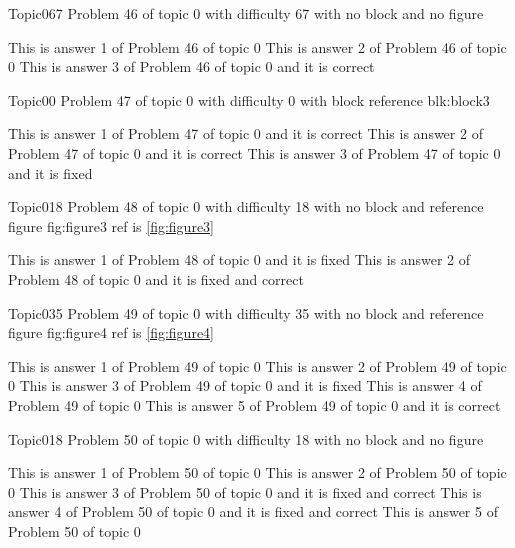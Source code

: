 \documentclass[master]{exam}
\begin{document}
\begin{problem}{Topic0}{67}
	Problem 46 of topic 0 with difficulty 67 with no block and no figure
	\begin{answers}
		\answer This is answer 1 of Problem 46 of topic 0 
		\answer This is answer 2 of Problem 46 of topic 0 
		\answer[correct] This is answer 3 of Problem 46 of topic 0 and it is correct
	\end{answers}
\end{problem}

\begin{problem}[requires=blk:block3]{Topic0}{0}
	Problem 47 of topic 0 with difficulty 0 with block reference blk:block3
	\begin{answers}
		\answer[correct] This is answer 1 of Problem 47 of topic 0 and it is correct
		\answer[correct] This is answer 2 of Problem 47 of topic 0 and it is correct
		\answer[fixed] This is answer 3 of Problem 47 of topic 0 and it is fixed
	\end{answers}
\end{problem}

\begin{problem}{Topic0}{18}
	Problem 48 of topic 0 with difficulty 18 with no block and reference figure fig:figure3 ref is \ref{fig:figure3}
	\begin{answers}
		\answer[fixed] This is answer 1 of Problem 48 of topic 0 and it is fixed
		 This is answer 2 of Problem 48 of topic 0 and it is fixed and correct
	\end{answers}
\end{problem}

\begin{problem}{Topic0}{35}
	Problem 49 of topic 0 with difficulty 35 with no block and reference figure fig:figure4 ref is \ref{fig:figure4}
	\begin{answers}
		\answer This is answer 1 of Problem 49 of topic 0 
		\answer This is answer 2 of Problem 49 of topic 0 
		\answer[fixed] This is answer 3 of Problem 49 of topic 0 and it is fixed
		\answer This is answer 4 of Problem 49 of topic 0 
		\answer[correct] This is answer 5 of Problem 49 of topic 0 and it is correct
	\end{answers}
\end{problem}

\begin{problem}{Topic0}{18}
	Problem 50 of topic 0 with difficulty 18 with no block and no figure
	\begin{answers}
		\answer This is answer 1 of Problem 50 of topic 0 
		\answer This is answer 2 of Problem 50 of topic 0 
		 This is answer 3 of Problem 50 of topic 0 and it is fixed and correct
		 This is answer 4 of Problem 50 of topic 0 and it is fixed and correct
		\answer This is answer 5 of Problem 50 of topic 0 
	\end{answers}
\end{problem}
\end{document}
